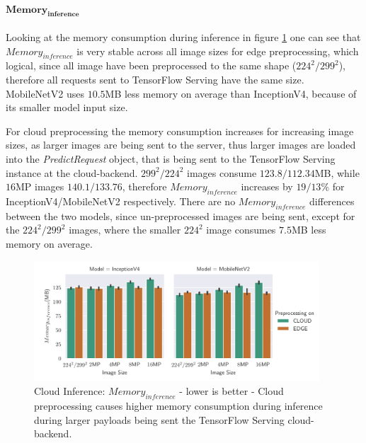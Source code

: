 \paragraph{$\mathbf{Memory_{inference}}$}
Looking at the memory consumption during inference in figure \ref{fig:cloudInferenceInferenceMemory} one can see that $Memory_{inference}$ is very stable across all image sizes for edge preprocessing, which logical, since all image have been preprocessed to the same shape ($224^2/299^2$), therefore all requests sent to TensorFlow Serving have the same size.
MobileNetV2 uses $10.5$MB less memory on average than InceptionV4, because of its smaller model input size.

For cloud preprocessing the memory consumption increases for increasing image sizes, as larger images are being sent to the server, thus larger images are loaded into the \emph{PredictRequest} object, that is being sent to the  TensorFlow Serving instance at the cloud-backend.
$299^2/224^2$ images consume $123.8/112.34$MB, while $16$MP images $140.1/133.76$, therefore $Memory_{inference}$ increases by $19/13\%$ for InceptionV4/MobileNetV2 respectively.
There are no $Memory_{inference}$  differences between the two models, since un-preprocessed images are being sent, except for the $224^2/299^2$ images, where the smaller $224^2$ image consumes $7.5$MB less memory on average.
\begin{figure}[!htb]
\centering
\includegraphics[width=0.95\textwidth]{./Bilder/single_plots/cloud_inference_plots/Cloud_Inference_Memory.pdf}
\caption[Cloud Inference:  $Memory_{inference}$ - lower is better]{Cloud Inference:  $Memory_{inference}$ - lower is better - Cloud preprocessing causes higher memory consumption during inference during larger payloads being sent the TensorFlow Serving cloud-backend.}
\label{fig:cloudInferenceInferenceMemory}
\end{figure}
